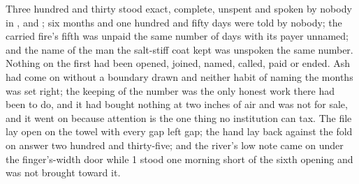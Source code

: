 Three hundred and thirty stood exact, complete, unspent and spoken by nobody in ,  and ; six months and one hundred and fifty days were told by nobody; the carried fire's fifth was unpaid the same number of days with its payer unnamed; and the name of the man the salt-stiff coat kept was unspoken the same number. Nothing on the first had been opened, joined, named, called, paid or ended. Ash had come on without a boundary drawn and neither habit of naming the months was set right; the keeping of the number was the only honest work there had been to do, and it had bought nothing at two inches of air and was not for sale, and it went on because attention is the one thing no institution can tax. The file lay open on the towel with every gap left gap; the hand lay back against the fold on answer two hundred and thirty-five; and the river's low note came on under the finger's-width door while  1 stood one morning short of the sixth opening and was not brought toward it.

